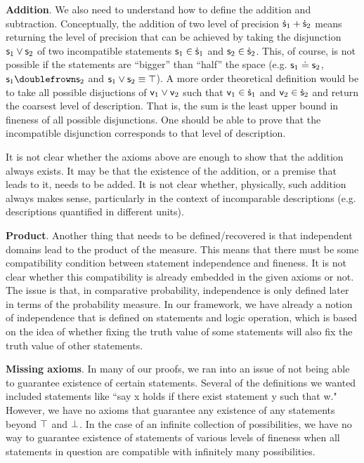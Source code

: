 \documentclass[11pt]{article}
\begin{document}
\textbf{Addition}. We also need to understand how to define the addition and subtraction. Conceptually, the addition of two level of precision $\dot{\stmt}_1 + \dot{\stmt}_2$ means returning the level of precision that can be achieved by taking the disjunction $\stmt_1 \OR \stmt_2$ of two incompatible statements $\stmt_1 \in \dot{\stmt}_1$ and $\stmt_2 \in \dot{\stmt}_2$. This, of course, is not possible if the statements are ``bigger'' than ``half'' the space (e.g. $\stmt_1 \eqgran \stmt_2$, $\stmt_1 \comp \stmt_2$ and $\stmt_1 \OR \stmt_2 \equiv \certainty$). A more order theoretical definition would be to take all possible disjuctions of $\stmt[v]_1 \OR \stmt[v]_2$ such that $\stmt[v]_1 \in \dot{\stmt}_1$ and $\stmt[v]_2 \in \dot{\stmt}_2$ and return the coarsest level of description. That is, the sum is the least upper bound in fineness of all possible disjunctions. One should be able to prove that the incompatible disjunction corresponds to that level of description.

It is not clear whether the axioms above are enough to show that the addition always exists. It may be that the existence of the addition, or a premise that leads to it, needs to be added. It is not clear whether, physically, such addition always makes sense, particularly in the context of incomparable descriptions (e.g. descriptions quantified in different units).

\textbf{Product}. Another thing that needs to be defined/recovered is that independent domains lead to the product of the measure. This means that there must be some compatibility condition between statement independence and fineness. It is not clear whether this compatibility is already embedded in the given axioms or not. The issue is that, in comparative probability, independence is only defined later in terms of the probability measure. In our framework, we have already a notion of independence that is defined on statements and logic operation, which is based on the idea of whether fixing the truth value of some statements will also fix the truth value of other statements.

\textbf{Missing axioms}. In many of our proofs, we ran into an issue of not being able to guarantee existence of certain statements. Several of the definitions we wanted included statements like ``say x holds if there exist statement y such that w." However, we have no axioms that guarantee any existence of any statements beyond $\certainty$ and $\impossibility$. In the case of an infinite collection of possibilities, we have no way to guarantee existence of statements of various levels of fineness when all statements in question are compatible with infinitely many possibilities. 
\end{document}
